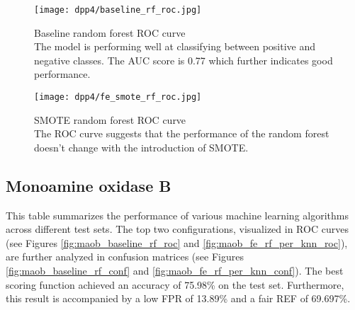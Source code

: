\begin{figure}[H]
    \begin{center}
        \captionsetup{justification=centering}
        \texttt{[image: dpp4/baseline\_rf\_roc.jpg]}
        \caption[]{Baseline random forest ROC curve\\
            The model is performing well at classifying between positive and negative classes. The AUC score is 0.77 which further indicates good performance.
        }
        \label{fig:dpp4_baseline_rf_roc}
    \end{center}
\end{figure}

\begin{figure}[H]
    \begin{center}
        \captionsetup{justification=centering}
        \texttt{[image: dpp4/fe\_smote\_rf\_roc.jpg]}
        \caption[]{SMOTE random forest ROC curve\\
            The ROC curve suggests that the performance of the random forest doesn't change with the introduction of SMOTE.
        }
        \label{fig:dpp4_smote_rf_roc}
    \end{center}
\end{figure}

\subsection{Monoamine oxidase B}
This table summarizes the performance of various machine learning algorithms across different test sets.
The top two configurations, visualized in ROC curves (see Figures \ref{fig:maob_baseline_rf_roc} and \ref{fig:maob_fe_rf_per_knn_roc}),
are further analyzed in confusion matrices (see Figures \ref{fig:maob_baseline_rf_conf} and \ref{fig:maob_fe_rf_per_knn_conf}).
The best scoring function achieved an accuracy of 75.98\% on the test set. Furthermore, this result is accompanied by a low FPR of 13.89\% and a fair REF of 69.697\%.

